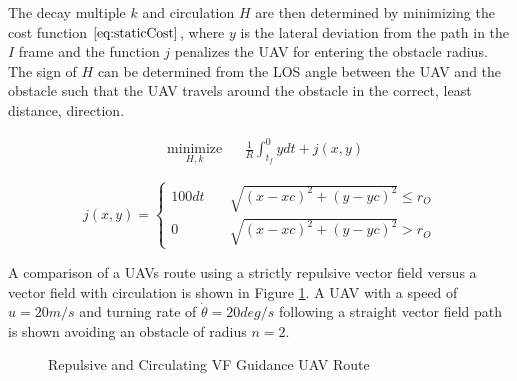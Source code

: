 \documentclass[conf]{new-aiaa}
\begin{document}
The decay multiple $k$ and circulation $H$ are then determined by minimizing the cost function $\ref{eq:staticCost}$, where $y$ is the lateral deviation from the path in the $I$ frame and the function $j$ penalizes the UAV for entering the obstacle radius. The sign of $H$ can be determined from the LOS angle between the UAV and the obstacle such that the UAV travels around the obstacle in the correct, least distance, direction.

\begin{equation}
\label{eq:staticCost}
\begin{aligned}
& \underset{H,k}{\text{minimize}}
& & \frac{1}{R}\int_{t_f}^{0}ydt + j(x,y) 
\end{aligned}
\end{equation}


\begin{equation}
j(x,y) = \left\{
\begin{array}{ll}
100dt & \quad \sqrt{(x-xc)^2+(y-yc)^2} \leq r_O \\
0 & \quad \sqrt{ (x-xc)^2+(y-yc)^2 } > r_O
\end{array}
\right.
\end{equation}




A comparison of a UAVs route using a strictly repulsive vector field versus a vector field with circulation is shown in Figure \ref{fig:noCircVsCirc}. A UAV with a speed of $u=20 m/s$ and turning rate of $\dot{\theta} = 20 deg/s$ following a straight vector field path is shown avoiding an obstacle of radius $n=2$.

\begin{figure}[H]
	\begin{subfigmatrix}{2}%
		\centering	
		\hspace*{0mm}
	\end{subfigmatrix}
	\caption{Repulsive and Circulating VF Guidance UAV Route}
	\label{fig:noCircVsCirc}
\end{figure}
\end{document}
